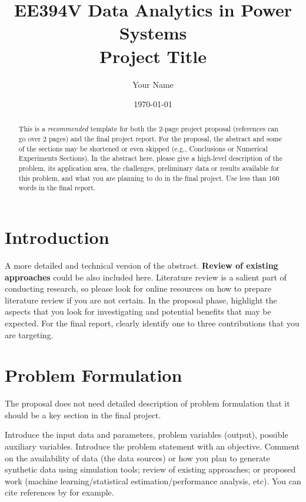 \documentclass[11pt]{article}
\begin{document}
\title{\bf EE394V Data Analytics in Power Systems\\
	Project Title
}
\date{\today}
\author{Your Name}
\maketitle

\begin{abstract}
	This is a \emph{recommended} template for both the 2-page project proposal (references can go over 2 pages) and the final project report. For the proposal, the abstract and some of the sections may be shortened or even skipped (e.g., Conclusions or Numerical Experiments Sections). In the abstract here, please give a high-level description of the problem, its application area, the challenges, preliminary data or results available for this problem, and what you are planning to do in the final project. Use less than 160 words in the final report.
\end{abstract}

\section{Introduction}\label{sec:intro}
A more detailed and technical version of the abstract. \textbf{Review of existing approaches} could be also included here. Literature review is a salient part of conducting research, so please look for online resources on how to prepare literature review if you are not certain. In the proposal phase, highlight the aspects that you look for investigating and potential benefits that may be expected. For the final report, clearly identify one to three contributions that you are targeting. 

\section{Problem Formulation}\label{sec:problem}
The proposal does not need detailed description of problem formulation that it should be a key section in the final project. 

Introduce the input data and parameters, problem variables (output), possible auxiliary variables. Introduce the problem statement with an objective. Comment on the availability of data (the data sources) or how you plan to generate synthetic data using simulation tools; review of existing approaches; or proposed work (machine learning/statistical estimation/performance analysis, etc). You can cite references by \cite{WWS,YGC02} for example.
\end{document}
